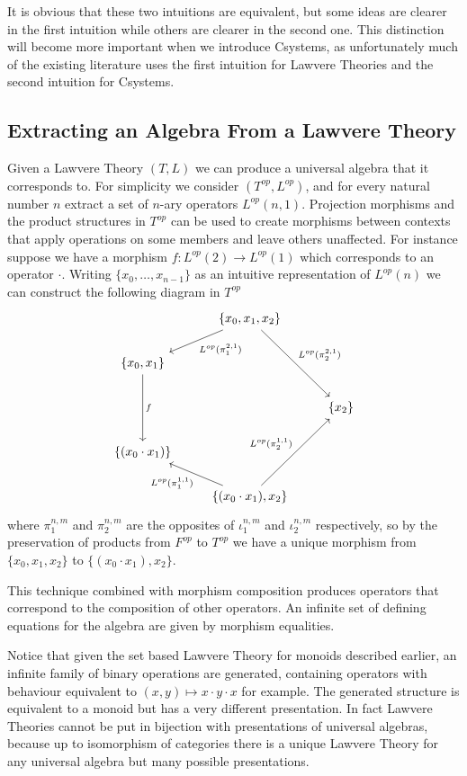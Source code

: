 It is obvious that these two intuitions are equivalent, but some ideas are
clearer in the first intuition while others are clearer in the second one. This
distinction will become more important when we introduce Csystems, as
unfortunately much of the existing literature uses the first intuition for
Lawvere Theories and the second intuition for Csystems.

\subsection{Extracting an Algebra From a Lawvere Theory}
Given a Lawvere Theory $(T,L)$ we can produce a universal algebra that it
corresponds to. For simplicity we consider $(T^{op}, L^{op})$, and for every
natural number $n$ extract a set of $n$-ary operators $L^{op}(n,1)$. Projection
morphisms and the product structures in $T^{op}$ can be used to create morphisms
between contexts that apply operations on some members and leave others
unaffected. For instance suppose we have a morphism $f : L^{op}(2)\to L^{op}(1)$
which corresponds to an operator $\cdot$. Writing $\{x_0,\ldots, x_{n-1}\}$ as
an intuitive representation of $L^{op}(n)$ we can construct the following
diagram in $T^{op}$
\[
\begin{tikzcd}
    &\{x_0, x_1, x_2\}
    \ar[ld, "L^{op}({\pi_{1}^{2,1}})"]
    \ar[rdd, "L^{op}({\pi_{2}^{2, 1}})"]
    & \\
    \{x_0, x_1\}\ar[dd, "f"]&& \\
    &&\{x_2\} \\
    \{(x_0\cdot x_1)\}&& \\
    &\{(x_0\cdot x_1), x_2\}
    \ar[ul, "L^{op}({\pi_{1}^{1,1}})"]
    \ar[uur, "L^{op}({\pi_{2}^{1,1}})"]
    &
\end{tikzcd}
\]
where $\pi_1^{n, m}$ and $\pi_2^{n, m}$ are the opposites of $\iota_1^{n,m}$ and
$\iota_2^{n,m}$ respectively, so by the preservation of products from $F^{op}$
to $T^{op}$ we have a unique morphism from $\{x_0, x_1, x_2\}$ to $\{(x_0\cdot
x_1), x_2\}$.

This technique combined with morphism composition produces operators
that correspond to the composition of other operators. An infinite set of
defining equations for the algebra are given by morphism equalities.

Notice that given the set based Lawvere Theory for monoids described earlier, an
infinite family of binary operations are generated, containing operators with
behaviour equivalent to $(x,y)\mapsto x\cdot y\cdot x$ for example. The
generated structure is equivalent to a monoid but has a very different
presentation. In fact Lawvere Theories cannot be put in bijection with
presentations of universal algebras, because up to isomorphism of categories
there is a unique Lawvere Theory for any universal algebra but many possible
presentations.

